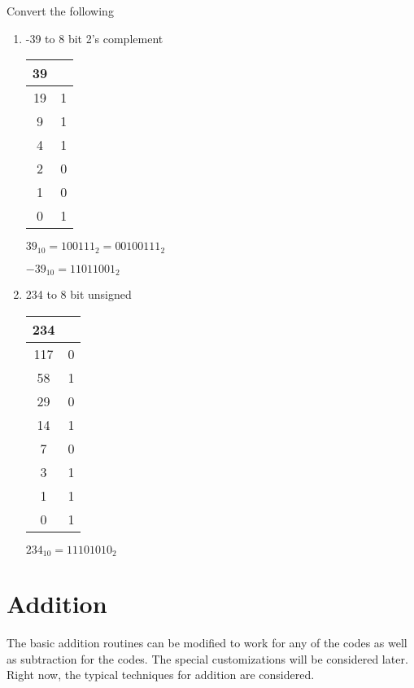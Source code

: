 \begin{example}

Convert the following
    \begin{enumerate}
        \item -39 to 8 bit 2's complement

    {\color{ans}
    \begin{tabular}{c|c}
      39 &  \\ \hline
      19 & 1 \\
       9 & 1 \\
       4 & 1 \\
       2 & 0 \\
       1 & 0 \\
       0 & 1 \\
    \end{tabular}

    $39_{10}=100111_2=00100111_2$

    $-39_{10}=11011001_2$
    }
        \item 234 to 8 bit unsigned

    {\color{ans}
    \begin{tabular}{c|c}
      234 &  \\ \hline
      117 & 0 \\
       58 & 1 \\
       29 & 0 \\
       14 & 1 \\
        7 & 0 \\
        3 & 1 \\
        1 & 1 \\
        0 & 1 \\
    \end{tabular}

    $234_{10}=11101010_2$
    }
\end{enumerate}
\end{example}

\section{Addition}

The basic addition routines can be modified to work for any of the codes as well as subtraction for the codes.  The special customizations will be considered later.  Right now, the typical techniques for addition are considered.

